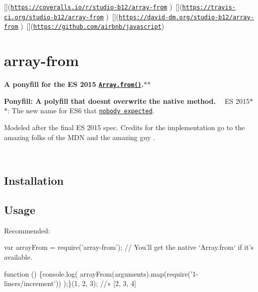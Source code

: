 \mbox{[}\mbox{]}(\href{https://coveralls.io/r/studio-b12/array-from}{\tt https\+://coveralls.\+io/r/studio-\/b12/array-\/from} ) \mbox{[}\mbox{]}(\href{https://travis-ci.org/studio-b12/array-from}{\tt https\+://travis-\/ci.\+org/studio-\/b12/array-\/from} ) \mbox{[}\mbox{]}(\href{https://david-dm.org/studio-b12/array-from}{\tt https\+://david-\/dm.\+org/studio-\/b12/array-\/from} ) \mbox{[}\mbox{]}(\href{https://github.com/airbnb/javascript}{\tt https\+://github.\+com/airbnb/javascript})

\section*{array-\/from }

{\bfseries A ponyfill for the ES 2015 \href{https://developer.mozilla.org/en-US/docs/Web/JavaScript/Reference/Global_Objects/Array/from}{\tt {\ttfamily Array.\+from()}}.$\ast$$\ast$}

{\bfseries {\bfseries  Ponyfill}\+: A polyfill that doesn\textquotesingle{}t overwrite the native method. ~\newline
} ES 2015$\ast$$\ast$\+: The new name for E\+S6 that \href{http://webreflection.blogspot.de/2015/01/javascript-and-living-ecmascript.html}{\tt nobody expected}.

Modeled after the final ES 2015 spec. Credits for the implementation go to the amazing folks of the M\+DN and the amazing guy \href{https://github.com/barberboy}{\tt }.

~

\subsection*{Installation }




\subsection*{Usage }

Recommended\+:


\begin{DoxyCode}
var arrayFrom = require('array-from');
  // You’ll get the native `Array.from` if it’s available.

function () \{console.log(
  arrayFrom(arguments).map(require('1-liners/increment'))
);\}(1, 2, 3);
//» [2, 3, 4]
\end{DoxyCode}


